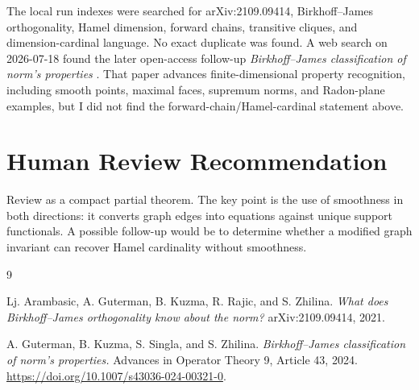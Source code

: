 \documentclass[11pt]{article}
\begin{document}
The local run indexes were searched for arXiv:2109.09414, Birkhoff--James
orthogonality, Hamel dimension, forward chains, transitive cliques, and
dimension-cardinal language.  No exact duplicate was found.  A web search on
2026-07-18 found the later open-access follow-up
\emph{Birkhoff--James classification of norm's properties} \cite{GKSSZ2024}.
That paper advances finite-dimensional property recognition, including smooth
points, maximal faces, supremum norms, and Radon-plane examples, but I did not
find the forward-chain/Hamel-cardinal statement above.

\section*{Human Review Recommendation}

Review as a compact partial theorem.  The key point is the use of smoothness in
both directions: it converts graph edges into equations against unique support
functionals.  A possible follow-up would be to determine whether a modified
graph invariant can recover Hamel cardinality without smoothness.

\begin{thebibliography}{9}

Lj. Arambasic, A. Guterman, B. Kuzma, R. Rajic, and S. Zhilina.
\emph{What does Birkhoff--James orthogonality know about the norm?}
arXiv:2109.09414, 2021.

A. Guterman, B. Kuzma, S. Singla, and S. Zhilina.
\emph{Birkhoff--James classification of norm's properties.}
Advances in Operator Theory 9, Article 43, 2024.
\url{https://doi.org/10.1007/s43036-024-00321-0}.

\end{thebibliography}
\end{document}
